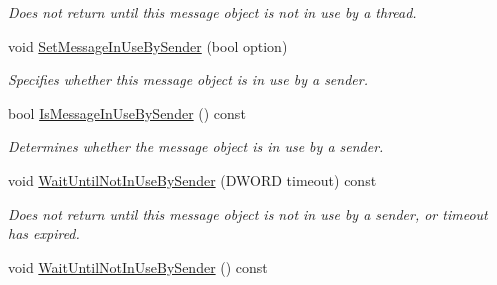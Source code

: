 \begin{DoxyCompactItemize}
\begin{DoxyCompactList}\small\item\em Does not return until this message object is not in use by a thread. \item\end{DoxyCompactList}\item 
void \hyperlink{class_thread_message_item_ab47019a21f41cebd7506de6835ad1cb9}{SetMessageInUseBySender} (bool option)
\begin{DoxyCompactList}\small\item\em Specifies whether this message object is in use by a sender. \item\end{DoxyCompactList}\item 
bool \hyperlink{class_thread_message_item_a8648192ebbace8ff8e8f3a16b919b42f}{IsMessageInUseBySender} () const 
\begin{DoxyCompactList}\small\item\em Determines whether the message object is in use by a sender. \item\end{DoxyCompactList}\item 
void \hyperlink{class_thread_message_item_adbfd865abb806bc305380e4da8836902}{WaitUntilNotInUseBySender} (DWORD timeout) const 
\begin{DoxyCompactList}\small\item\em Does not return until this message object is not in use by a sender, or timeout has expired. \item\end{DoxyCompactList}\item 
\hypertarget{class_thread_message_item_adceab2b1a3e76d13d277f48b92066d66}{
void \hyperlink{class_thread_message_item_adceab2b1a3e76d13d277f48b92066d66}{WaitUntilNotInUseBySender} () const }
\label{class_thread_message_item_adceab2b1a3e76d13d277f48b92066d66}


\end{DoxyCompactItemize}
